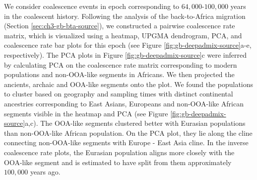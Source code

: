 We consider coalescence events in epoch corresponding to $64{,}000$-$100{,}000$ years in the coalescent history. Following the analysis of the back-to-Africa migration (Section \ref{sec:ch3-gb-bta-source}), we constructed a pairwise coalescence rate matrix, which is visualized using a heatmap, UPGMA dendrogram, PCA, and coalescence rate bar plots for this epoch (see Figure \ref{fig:gb-deepadmix-source}a-e, respectively). The PCA plots in Figure \ref{fig:gb-deepadmix-source}c were inferred by calculating PCA on the coalescence rate matrix corresponding to modern populations and non-OOA-like segments in Africans. We then projected the ancients, archaic and OOA-like segments onto the plot. We found the populations to cluster based on geography and sampling times with distinct continental ancestries corresponding to East Asians, Europeans and non-OOA-like African segments visible in the heatmap and PCA (see Figure \ref{fig:gb-deepadmix-source}a,c). The OOA-like segments clustered better with Eurasian populations than non-OOA-like African population. On the PCA plot, they lie along the cline connecting non-OOA-like segments with Europe - East Asia cline. In the inverse coalescence rate plots, the Eurasian population aligns more closely with the OOA-like segment and is estimated to have split from them approximately $100{,}000$ years ago.

